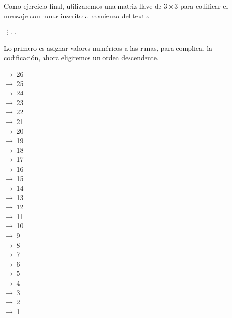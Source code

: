 \documentclass[12pt,a4paper]{article}
\begin{document}
Como ejercicio final, utilizaremos una matriz llave de $3\times 3$ para codificar el mensaje con runas inscrito al comienzo del texto:
\vspace{0.2cm}
\begin{center}
               \vdots  \textara{\th}. \textara{\th}.
\end{center}
\vspace{0.2cm}
 Lo primero es asignar valores num\'ericos a las runas, para complicar la codificaci\'on, ahora eligiremos un orden descendente.

\begin{multicols}{7}
\noindent{}$\rightarrow$ 26\\
$\rightarrow$ 25\\
$\rightarrow$ 24\\
$\rightarrow$ 23\\
$\rightarrow$ 22\\
$\rightarrow$ 21\\
$\rightarrow$ 20\\
$\rightarrow$ 19\\
$\rightarrow$ 18\\
$\rightarrow$ 17\\
$\rightarrow$ 16\\
$\rightarrow$ 15\\
$\rightarrow$ 14\\
$\rightarrow$ 13\\
\textara{\ng}$\rightarrow$ 12\\
$\rightarrow$ 11\\
$\rightarrow$ 10\\
$\rightarrow$ 9\\
$\rightarrow$ 8\\
$\rightarrow$ 7\\
$\rightarrow$ 6\\
\textara{\th } $\rightarrow$ 5\\
$\rightarrow$ 4\\
$\rightarrow$ 3\\
$\rightarrow$ 2\\
$\rightarrow$ 1\\

\end{multicols}
 
\end{document}
